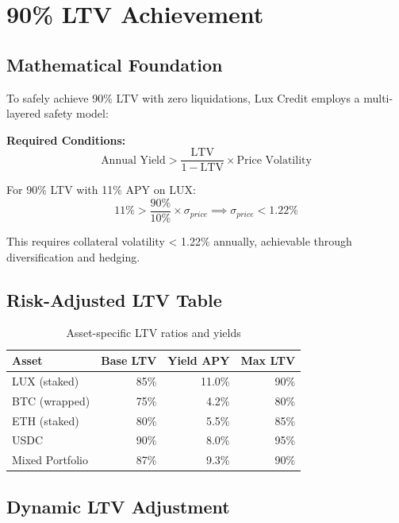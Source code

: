 \documentclass[11pt,a4paper]{article}
\begin{document}
\section{90\% LTV Achievement}

\subsection{Mathematical Foundation}

To safely achieve 90\% LTV with zero liquidations, Lux Credit employs a multi-layered safety model:

\textbf{Required Conditions:}
\begin{equation}
\text{Annual Yield} > \frac{\text{LTV}}{1 - \text{LTV}} \times \text{Price Volatility}
\end{equation}

For 90\% LTV with 11\% APY on LUX:
\begin{equation}
11\% > \frac{90\%}{10\%} \times \sigma_{price} \implies \sigma_{price} < 1.22\%
\end{equation}

This requires collateral volatility < 1.22\% annually, achievable through diversification and hedging.

\subsection{Risk-Adjusted LTV Table}

\begin{table}[h]
\centering
\begin{tabular}{@{}lrrr@{}}
\toprule
\textbf{Asset} & \textbf{Base LTV} & \textbf{Yield APY} & \textbf{Max LTV} \\ \midrule
LUX (staked) & 85\% & 11.0\% & 90\% \\
BTC (wrapped) & 75\% & 4.2\% & 80\% \\
ETH (staked) & 80\% & 5.5\% & 85\% \\
USDC & 90\% & 8.0\% & 95\% \\
Mixed Portfolio & 87\% & 9.3\% & 90\% \\ \bottomrule
\end{tabular}
\caption{Asset-specific LTV ratios and yields}
\end{table}

\subsection{Dynamic LTV Adjustment}
\end{document}
